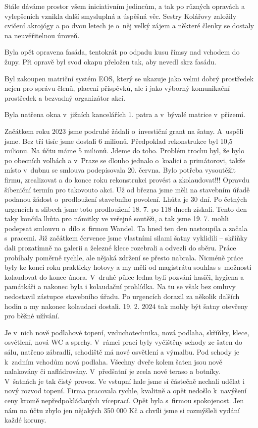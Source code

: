 \documentclass[11pt]{article}
\begin{document}
Stále dáváme prostor všem iniciativním jedincům, a tak po různých opravách a vylepšeních vznikla další smysluplná a úspěšná věc. Sestry Kolářovy založily cvičení akrojógy a po dvou letech je o~něj velký zájem a některé členky se dostaly na neuvěřitelnou úroveň.

Byla opět opravena fasáda, tentokrát po odpadu kusu římsy nad vchodem do župy. Při opravě byl svod okapu přeložen tak, aby nevedl skrz fasádu.

Byl zakoupen matriční systém EOS, který se ukazuje jako velmi dobrý prostředek nejen pro správu členů, placení příspěvků, ale i jako výborný komunikační prostředek a bezvadný organizátor akcí.

Byla natřena okna v~jižních kancelářích 1. patra a v~bývalé matrice v~přízemí.

Začátkem roku 2023 jsme podruhé žádali o~investiční grant na šatny. A~uspěli jsme. Bez tří tisíc jsme dostali 6 milionů. Předpoklad rekonstrukce byl 10,5 milionu. Na účtu máme 5 milionů. Jdeme do toho. Problém trochu byl, že bylo po obecních volbách a v~Praze se dlouho jednalo o~koalici a primátorovi, takže místo v~dubnu se smlouva podepisovala 20. června. Bylo potřeba vysoutěžit firmu, zrealizovat a do konce roku rekonstrukci provést a zkolaudovat!!! Opravdu šibeniční termín pro takovouto akci. Už od března jsme měli na stavebním úřadě podanou žádost o~prodloužení stavebního povolení. Lhůta je 30 dní. Po četných urgencích a slibech jsme toto prodloužení 18. 7. po 118 dnech získali. Tento den taky končila lhůta pro námitky ve veřejné soutěži, a tak jsme 19. 7. mohli podepsat smlouvu o~dílo s~firmou Wandel. Ta hned ten den nastoupila a začala s~pracemi. Již začátkem července jsme vlastními silami šatny vyklidili – skříňky dali prozatímně na galerii a železné klece rozebrali a odvezli do sběru. Práce probíhaly poměrně rychle, ale nějaká zdržení se přesto nabrala. Nicméně práce byly ke konci roku prakticky hotovy a my měli od magistrátu souhlas s~možností kolaudovat do konce února. V~druhé půlce ledna byli pozváni hasiči, hygiena a památkáři a nakonec byla i kolaudační prohlídka. Na tu se však bez omluvy nedostavil zástupce stavebního úřadu. Po urgencích dorazil za několik dalších hodin a my nakonec kolaudaci dostali. 19. 2. 2024 tak mohly být šatny otevřeny pro běžné užívání. 

Je v~nich nově podlahové topení, vzduchotechnika, nová podlaha, skříňky, klece, osvětlení, nová WC a sprchy. V~rámci prací byly vyčištěny schody ze šaten do sálu, natřeno zábradlí, schodiště má nové osvětlení a výmalbu. Pod schody je k~zadním vchodům nová podlaha. Všechny dveře kolem šaten jsou nově nalakovány či nafládrovány. V~předšatní je zcela nové teraso a botníky. V~šatnách je tak čistý provoz. Ve vstupní hale jsme si částečně nechali udělat i nový rozvod topení. Firma pracovala rychle, kvalitně a opět nedošlo k~navýšení ceny kromě nepředpokládaných víceprací. Opět byla s~firmou spokojenost.
Jen nám na účtu zbylo jen nějakých 350 000 Kč a chvíli jsme si rozmýšleli vydání každé koruny.
\end{document}
